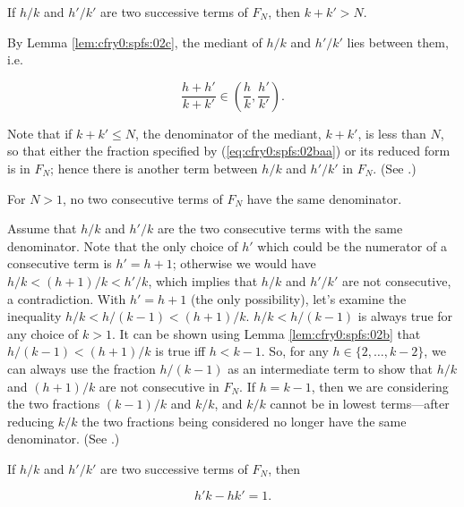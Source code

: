 \begin{vworktheoremstatement}
\label{thm:cfry0:spfs:02ba}
If $h/k$ and $h'/k'$ are two successive terms
of $F_N$, then $k + k' > N$.
\end{vworktheoremstatement}
\begin{vworktheoremproof}
By Lemma \ref{lem:cfry0:spfs:02c}, 
the mediant of $h/k$ and $h'/k'$ lies between them, i.e.

\begin{equation}
\label{eq:cfry0:spfs:02baa}
\frac{h + h'}{k + k'} \in \left( { \frac{h}{k}, \frac{h'}{k'}} \right) .
\end{equation}

Note that if $k+k' \leq N$, the denominator of the mediant, $k+k'$, is less than
$N$, so that either the fraction specified by (\ref{eq:cfry0:spfs:02baa}) or its 
reduced form is in $F_N$; hence there is another term between $h/k$ and 
$h'/k'$ in $F_N$.  (See \cite[Thm. 30, p. 23]{bibref:b:HardyAndWrightClassic}.)
\end{vworktheoremproof}

\begin{vworktheoremstatement}
\label{thm:cfry0:spfs:02c}
For $N > 1$, no two consecutive terms of $F_N$ have the
same denominator.
\end{vworktheoremstatement}
\begin{vworktheoremproof}
Assume that $h/k$ and $h'/k$ are the two consecutive terms with 
the same denominator.  Note that the only choice of $h'$ which
could be the numerator of a consecutive term is $h'=h+1$; otherwise 
we would have $h/k < (h+1)/k < h'/k$, which implies that $h/k$
and $h'/k'$ are not consecutive, a contradiction.  With
$h'=h+1$ (the only possibility), let's examine the inequality $h/k < h/(k-1) < (h+1)/k$.
$h/k < h/(k-1)$ is always true for any choice of $k>1$.  
It can be shown using Lemma \ref{lem:cfry0:spfs:02b}
that $h/(k-1) < (h+1)/k$ is true iff $h < k -1$.  So,
for any $h \in \{2, \ldots{} , k - 2 \}$, we can always use
the fraction $h/(k-1)$ as an intermediate term to show that
$h/k$ and $(h+1)/k$ are not consecutive in $F_N$.
If $h=k-1$, then we are considering the two fractions
$(k-1)/k$ and $k/k$, and $k/k$ cannot be in lowest 
terms---after reducing $k/k$ the two fractions 
being considered no longer have the
same denominator. (See \cite[Thm. 31, p. 24]{bibref:b:HardyAndWrightClassic}.)
\end{vworktheoremproof}

\begin{vworktheoremstatement}
\label{thm:cfry0:spfs:02}
If $h/k$ and $h'/k'$ are two successive terms of $F_N$, then

\begin{equation}
\label{eq:cfry0:spfs:thm02aa}
h'k - h k' = 1.
\end{equation}
\end{vworktheoremstatement}

